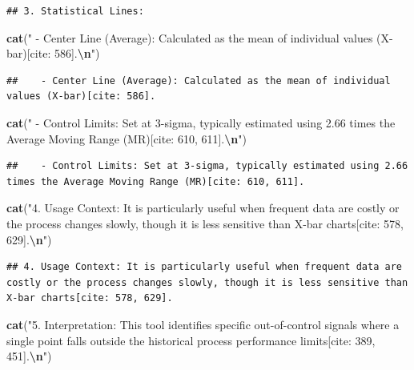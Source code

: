 \documentclass[
]{article}
\newenvironment{Shaded}{\begin{snugshade}}{\end{snugshade}}
\newcommand{\FunctionTok}[1]{\textcolor[rgb]{0.13,0.29,0.53}{\textbf{#1}}}
\newcommand{\NormalTok}[1]{#1}
\newcommand{\SpecialCharTok}[1]{\textcolor[rgb]{0.81,0.36,0.00}{\textbf{#1}}}
\newcommand{\StringTok}[1]{\textcolor[rgb]{0.31,0.60,0.02}{#1}}
\begin{document}
\begin{verbatim}
## 3. Statistical Lines:
\end{verbatim}

\begin{Shaded}
\begin{Highlighting}[]
\FunctionTok{cat}\NormalTok{(}\StringTok{"   {-} Center Line (Average): Calculated as the mean of individual values (X{-}bar)[cite: 586].}\SpecialCharTok{\textbackslash{}n}\StringTok{"}\NormalTok{)}
\end{Highlighting}
\end{Shaded}

\begin{verbatim}
##    - Center Line (Average): Calculated as the mean of individual values (X-bar)[cite: 586].
\end{verbatim}

\begin{Shaded}
\begin{Highlighting}[]
\FunctionTok{cat}\NormalTok{(}\StringTok{"   {-} Control Limits: Set at 3{-}sigma, typically estimated using 2.66 times the Average Moving Range (MR)[cite: 610, 611].}\SpecialCharTok{\textbackslash{}n}\StringTok{"}\NormalTok{)}
\end{Highlighting}
\end{Shaded}

\begin{verbatim}
##    - Control Limits: Set at 3-sigma, typically estimated using 2.66 times the Average Moving Range (MR)[cite: 610, 611].
\end{verbatim}

\begin{Shaded}
\begin{Highlighting}[]
\FunctionTok{cat}\NormalTok{(}\StringTok{"4. Usage Context: It is particularly useful when frequent data are costly or the process changes slowly, though it is less sensitive than X{-}bar charts[cite: 578, 629].}\SpecialCharTok{\textbackslash{}n}\StringTok{"}\NormalTok{)}
\end{Highlighting}
\end{Shaded}

\begin{verbatim}
## 4. Usage Context: It is particularly useful when frequent data are costly or the process changes slowly, though it is less sensitive than X-bar charts[cite: 578, 629].
\end{verbatim}

\begin{Shaded}
\begin{Highlighting}[]
\FunctionTok{cat}\NormalTok{(}\StringTok{"5. Interpretation: This tool identifies specific \textquotesingle{}out{-}of{-}control\textquotesingle{} signals where a single point falls outside the historical process performance limits[cite: 389, 451].}\SpecialCharTok{\textbackslash{}n}\StringTok{"}\NormalTok{)}
\end{Highlighting}
\end{Shaded}
\end{document}
